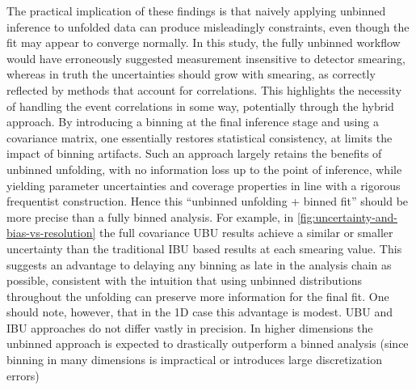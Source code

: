         The practical implication of these findings is that naively applying unbinned inference to unfolded data can produce misleadingly constraints, even though the fit may appear to converge normally.
        In this study, the fully unbinned workflow would have erroneously suggested measurement insensitive to detector smearing, whereas in truth the uncertainties should grow with smearing, as correctly reflected by methods that account for correlations.
        This highlights the necessity of handling the event correlations in some way, potentially through the hybrid approach.
        By introducing a binning at the final inference stage and using a covariance matrix, one essentially restores statistical consistency, at limits the impact of binning artifacts.
        Such an approach largely retains the benefits of unbinned unfolding, with no information loss up to the point of inference, while yielding parameter uncertainties and coverage properties in line with a rigorous frequentist construction.
        Hence this ``unbinned unfolding + binned fit'' should be more precise than a fully binned analysis.
        For example, in \cref{fig:uncertainty-and-bias-vs-resolution} the full covariance UBU results achieve a similar or smaller uncertainty than the traditional IBU based results at each smearing value.
        This suggests an advantage to delaying any binning as late in the analysis chain as possible, consistent with the intuition that using unbinned distributions throughout the unfolding can preserve more information for the final fit.
        One should note, however, that in the 1D case this advantage is modest.
        UBU and IBU approaches do not differ vastly in precision.
        In higher dimensions the unbinned approach is expected to drastically outperform a binned analysis (since binning in many dimensions is impractical or introduces large discretization errors)~\cite{Pan:2024rfh, Butter2023MachineGeneration, Plehn:2022ftl}
    
